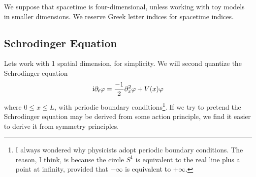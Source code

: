 We suppose that spacetime is four-dimensional, unless working with toy
models in smaller dimensions. We reserve Greek letter indices for
spacetime indices.

\subsection{Schrodinger Equation}
Lets work with 1 spatial dimension, for simplicity. We will second
quantize the Schrodinger equation
\begin{equation}
\mathrm{i}\partial_{t}\varphi = \frac{-1}{2}\partial_{x}^{2}\varphi + V(x)\varphi
\end{equation}
where $0\leq x\leq L$, with periodic boundary conditions\footnote{I
  always wondered why physicists adopt periodic boundary conditions. The
  reason, I think, is because the circle $S^{1}$ is equivalent to the
  real line plus a point at infinity, provided that $-\infty$ is
  equivalent to $+\infty$.}. If we try to pretend the Schrodinger
equation may be derived from some action principle, we find it easier to
derive it from symmetry principles. 

